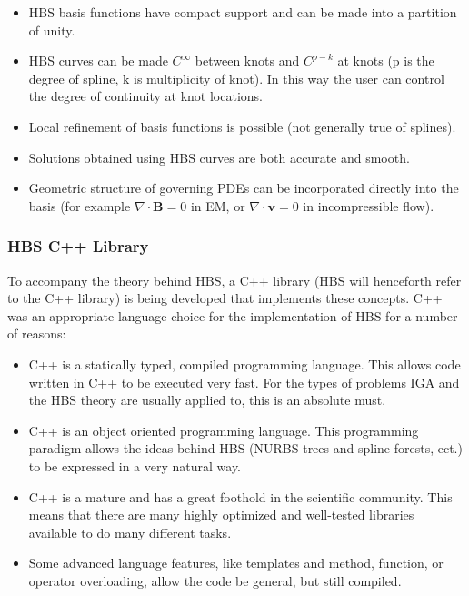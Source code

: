     \begin{itemize}
      \item HBS basis functions have compact support and can be made into a partition of unity.
      \item HBS curves can be made $C^{\infty}$ between knots and $C^{p-k}$ at knots (p is the degree of spline, k is multiplicity of knot). In this way the user can control the degree of continuity at knot locations.
      \item Local refinement of basis functions is possible (not generally true of splines).
      \item Solutions obtained using HBS curves are both accurate and smooth.
      \item Geometric structure of governing PDEs can be incorporated directly into the basis (for example $\nabla\cdot\mathbf{B} = 0$ in EM, or $\nabla\cdot\mathbf{v} = 0$ in incompressible flow).
    \end{itemize}
    \mainstretch{}

    \subsubsection{HBS C++ Library} \label{ssub:hbs_cpp_library}

    To accompany the theory behind HBS, a C++ library (HBS  will henceforth refer to the C++ library) is being developed that implements these concepts. C++ was an appropriate language choice for the implementation of HBS for a number of reasons:

    \begin{itemize}
      \item C++ is a statically typed, compiled programming language. This allows code written in C++ to be executed very fast. For the types of problems IGA and the HBS theory are usually applied to, this is an absolute must.
      \item C++ is an object oriented programming language. This programming paradigm allows the ideas behind HBS (NURBS trees and spline forests, ect.) to be expressed in a very natural way.
      \item C++ is a mature and has a great foothold in the scientific community. This means that there are many highly optimized and well-tested libraries available to do many different tasks.
      \item Some advanced language features, like templates and method, function, or operator overloading, allow the code be general, but still compiled.
    \end{itemize}
    \mainstretch{}

